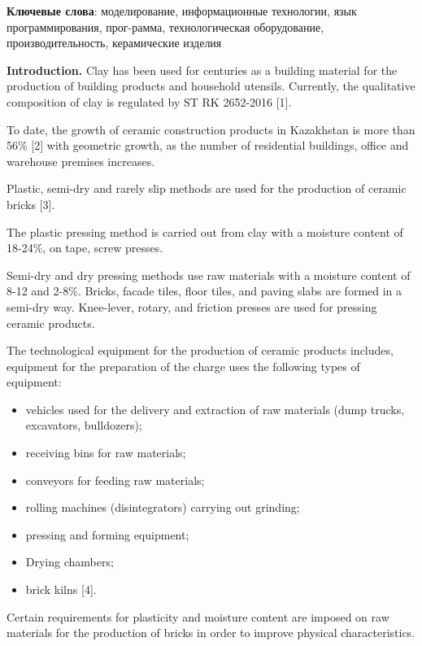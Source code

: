 {\bfseries Ключевые слова}: моделирование, информационные технологии, язык
программирования, прог-рамма, технологическая оборудование,
производительность, керамические изделия
\begin{multicols}{2}

{\bfseries Introduction.} Clay has been used for centuries as a building
material for the production of building products and household utensils.
Currently, the qualitative composition of clay is regulated by ST RK
2652-2016 {[}1{]}.

To date, the growth of ceramic construction products in Kazakhstan is
more than 56\% {[}2{]} with geometric growth, as the number of
residential buildings, office and warehouse premises increases.

Plastic, semi-dry and rarely slip methods are used for the production of
ceramic bricks {[}3{]}.

The plastic pressing method is carried out from clay with a moisture
content of 18-24\%, on tape, screw presses.

Semi-dry and dry pressing methods use raw materials with a moisture
content of 8-12 and 2-8\%. Bricks, facade tiles, floor tiles, and paving
slabs are formed in a semi-dry way. Knee-lever, rotary, and friction
presses are used for pressing ceramic products.

The technological equipment for the production of ceramic products
includes, equipment for the preparation of the charge uses the following
types of equipment:

\begin{itemize}
	\setlength{\itemindent}{1cm} 
	\item
	vehicles used for the delivery and extraction of raw materials (dump trucks, excavators, bulldozers);
	\item
	receiving bins for raw materials;
	\item
	conveyors for feeding raw materials;
	\item
	rolling machines (disintegrators) carrying out grinding;
	\item
	pressing and forming equipment;
	\item
	Drying chambers;
	\item
	brick kilns {[}4{]}.
\end{itemize}

Certain requirements for plasticity and moisture content are imposed on
raw materials for the production of bricks in order to improve physical
characteristics.


\end{multicols}
